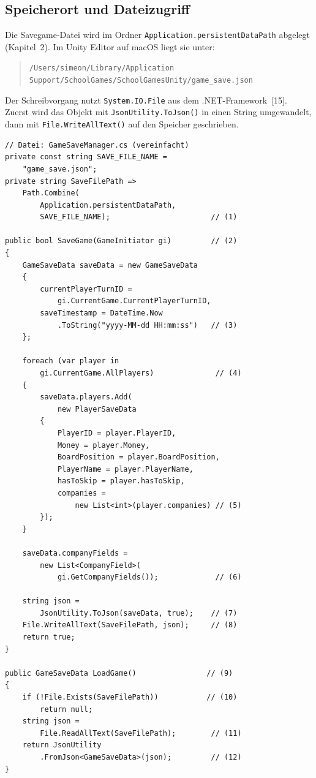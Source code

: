 \documentclass[12pt,a4paper]{article}
\begin{document}
\subsection{Speicherort und Dateizugriff}

Die Savegame-Datei wird im Ordner \texttt{Application.persistentDataPath} abgelegt (Kapitel~2). Im Unity Editor auf macOS liegt sie unter:

\begin{quote}
\small\texttt{/Users/simeon/Library/Application\allowbreak{} Support/\allowbreak{}SchoolGames/\allowbreak{}SchoolGamesUnity/\allowbreak{}game\_save.json}
\end{quote}

Der Schreibvorgang nutzt \texttt{System.IO.File} aus dem .NET-Framework~[15]. Zuerst wird das Objekt mit \texttt{JsonUtility.ToJson()} in einen String umgewandelt, dann mit \texttt{File.WriteAllText()} auf den Speicher geschrieben.

\begin{lstlisting}
// Datei: GameSaveManager.cs (vereinfacht)
private const string SAVE_FILE_NAME =
    "game_save.json";
private string SaveFilePath =>
    Path.Combine(
        Application.persistentDataPath,
        SAVE_FILE_NAME);                       // (1)

public bool SaveGame(GameInitiator gi)         // (2)
{
    GameSaveData saveData = new GameSaveData
    {
        currentPlayerTurnID =
            gi.CurrentGame.CurrentPlayerTurnID,
        saveTimestamp = DateTime.Now
            .ToString("yyyy-MM-dd HH:mm:ss")   // (3)
    };

    foreach (var player in
        gi.CurrentGame.AllPlayers)              // (4)
    {
        saveData.players.Add(
            new PlayerSaveData
        {
            PlayerID = player.PlayerID,
            Money = player.Money,
            BoardPosition = player.BoardPosition,
            PlayerName = player.PlayerName,
            hasToSkip = player.hasToSkip,
            companies =
                new List<int>(player.companies) // (5)
        });
    }

    saveData.companyFields =
        new List<CompanyField>(
            gi.GetCompanyFields());             // (6)

    string json =
        JsonUtility.ToJson(saveData, true);    // (7)
    File.WriteAllText(SaveFilePath, json);     // (8)
    return true;
}

public GameSaveData LoadGame()                // (9)
{
    if (!File.Exists(SaveFilePath))           // (10)
        return null;
    string json =
        File.ReadAllText(SaveFilePath);        // (11)
    return JsonUtility
        .FromJson<GameSaveData>(json);         // (12)
}
\end{lstlisting}
\end{document}
